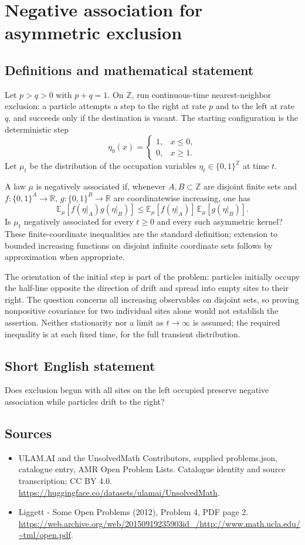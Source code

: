 \documentclass[11pt,a4paper]{article}
\begin{document}
\section*{Negative association for asymmetric exclusion}\label{statement}

\subsection{Definitions and mathematical statement}
Let $p>q>0$ with $p+q=1$. On $\mathbb Z$, run continuous-time nearest-neighbor exclusion: a particle attempts a step to the right at rate $p$ and to the left at rate $q$, and succeeds only if the destination is vacant. The starting configuration is the deterministic step
\[
\eta_0(x)=\begin{cases}1,&x\le0,\\0,&x\ge1.\end{cases}
\]
Let $\mu_t$ be the distribution of the occupation variables $\eta_t\in\{0,1\}^{\mathbb Z}$ at time $t$.

A law $\mu$ is negatively associated if, whenever $A,B\subset\mathbb Z$ are disjoint finite sets and $f:\{0,1\}^A\to\mathbb R$, $g:\{0,1\}^B\to\mathbb R$ are coordinatewise increasing, one has
\[
\mathbb E_\mu[f(\eta|_A)g(\eta|_B)]
\le \mathbb E_\mu[f(\eta|_A)]\,
     \mathbb E_\mu[g(\eta|_B)].
\]
Is $\mu_t$ negatively associated for every $t\ge0$ and every such asymmetric kernel? These finite-coordinate inequalities are the standard definition; extension to bounded increasing functions on disjoint infinite coordinate sets follows by approximation when appropriate.

The orientation of the initial step is part of the problem: particles initially occupy the half-line opposite the direction of drift and spread into empty sites to their right. The question concerns all increasing observables on disjoint sets, so proving nonpositive covariance for two individual sites alone would not establish the assertion. Neither stationarity nor a limit as $t\to\infty$ is assumed; the required inequality is at each fixed time, for the full transient distribution.
\subsection{Short English statement}
Does exclusion begun with all sites on the left occupied preserve negative association while particles drift to the right?
\subsection{Sources}
\begin{itemize}
\item[S1] ULAM.AI and the UnsolvedMath Contributors, supplied problems.json, catalogue entry, AMR Open Problem Lists. Catalogue identity and source transcription; CC BY 4.0.
\url{https://huggingface.co/datasets/ulamai/UnsolvedMath}.
\item[S2] Liggett - Some Open Problems (2012), Problem 4, PDF page 2. 
\url{https://web.archive.org/web/20150919235903id_/http://www.math.ucla.edu/~tml/open.pdf}.
\end{itemize}
\end{document}
